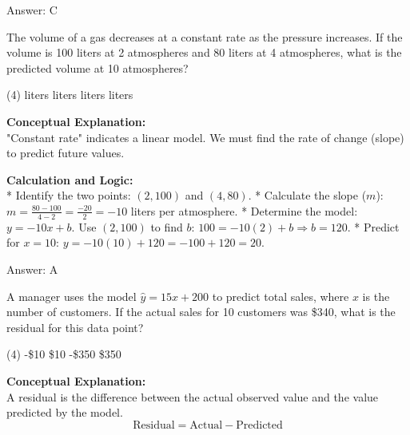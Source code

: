 \documentclass[11pt,paper=a4,answers]{exam}
\begin{document}
\begin{questions}
\begin{solution}
\vspace{30pt}

Answer: \colorbox{yellow!100}{C}
\end{solution}

\vspace{60pt}

\question
The volume of a gas decreases at a constant rate as the pressure increases. If the volume is 100 liters at 2 atmospheres and 80 liters at 4 atmospheres, what is the predicted volume at 10 atmospheres?
\begin{tasks}(4)
     liters
     liters
     liters
     liters
\end{tasks}

\begin{solution}
\textbf{Conceptual Explanation:} \\
"Constant rate" indicates a linear model. We must find the rate of change (slope) to predict future values.

\vspace{30pt}

\textbf{Calculation and Logic:} \\
* Identify the two points: $(2, 100)$ and $(4, 80)$.
* Calculate the slope ($m$): $m = \frac{80 - 100}{4 - 2} = \frac{-20}{2} = -10$ liters per atmosphere.
* Determine the model: $y = -10x + b$. Use $(2, 100)$ to find $b$: $100 = -10(2) + b \Rightarrow b = 120$.
* Predict for $x = 10$: $y = -10(10) + 120 = -100 + 120 = 20$.

\vspace{30pt}

Answer: \colorbox{yellow!100}{A}
\end{solution}

\vspace{60pt}

\question
A manager uses the model $\hat{y} = 15x + 200$ to predict total sales, where $x$ is the number of customers. If the actual sales for 10 customers was \$340, what is the residual for this data point?
\begin{tasks}(4)
    \task -\$10
    \task \$10
    \task -\$350
    \task \$350
\end{tasks}

\begin{solution}
\textbf{Conceptual Explanation:} \\
A residual is the difference between the actual observed value and the value predicted by the model. 
\[ \text{Residual} = \text{Actual} - \text{Predicted} \]


\end{solution}
\end{questions}
\end{document}

